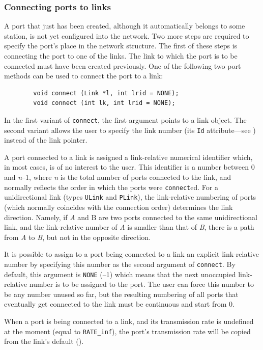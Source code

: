 \subsubsection{Connecting ports to links}
\label{rm_to_po_co}

A port that just has been created, although it automatically belongs to
some station, is not yet configured into the network.
Two more steps are required to specify the port's place in the network
structure.
The first of these steps is connecting the port to one of the links.
The link to which the port is to be connected must have been
created previously.
One of the following two port methods can be used to connect the port to a link:
\begin{verbatim}
        void connect (Link *l, int lrid = NONE);
        void connect (int lk, int lrid = NONE);
\end{verbatim}

In the first variant of {\tt connect}, the first argument points to
a link object.
The second variant allows the user to specify the link number (its {\tt Id}
attribute---see ) instead of the link pointer.

A port connected to a link is assigned a link-relative numerical identifier
which, in most cases, is of no interest to the user.
This identifier is a number between 0 and
{\em n\/}--1, where {\em n\/} is the total
number of ports connected to the link, and normally reflects the order
in which the ports were {\tt connect}ed.
For a unidirectional link (types {\tt ULink} and {\tt PLink}), the 
link-relative numbering of ports (which normally coincides with the
connection order) determines the link direction.
Namely, if {\em A\/} and {\rm B\/} are two ports connected to the same unidirectional
link, and the link-relative number of {\em A\/} is smaller than that of {\em B},
there is a path from {\em A\/} to {\em B}, but not in the opposite direction.

It is possible to assign to a port being connected to a link an explicit
link-relative number by specifying this number as the second
argument of {\tt connect}.
By default, this argument is {\tt NONE} (--1) which means that the next
unoccupied link-relative number is to be assigned to the port.
The user can force this number to be any number unused so far, but the
resulting numbering of all ports that eventually get connected to the link
must be continuous and start from 0.

When a port is being connected to a link, and its transmission rate is
undefined at the moment (equal to {\tt RATE\_inf}), the port's
transmission rate will be copied from the link's default
().

